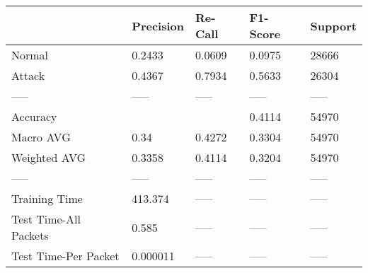 \begin{tabular}{lllll}
\toprule
{} & Precision & Re-Call & F1-Score & Support \\
\midrule
Normal                &    0.2433 &  0.0609 &   0.0975 &   28666 \\
Attack                &    0.4367 &  0.7934 &   0.5633 &   26304 \\
-----                 &     ----- &   ----- &    ----- &   ----- \\
Accuracy              &           &         &   0.4114 &   54970 \\
Macro AVG             &      0.34 &  0.4272 &   0.3304 &   54970 \\
Weighted AVG          &    0.3358 &  0.4114 &   0.3204 &   54970 \\
-----                 &     ----- &   ----- &    ----- &   ----- \\
Training Time         &   413.374 &   ----- &    ----- &   ----- \\
Test Time-All Packets &     0.585 &   ----- &    ----- &   ----- \\
Test Time-Per Packet  &  0.000011 &   ----- &    ----- &   ----- \\
\bottomrule
\end{tabular}
